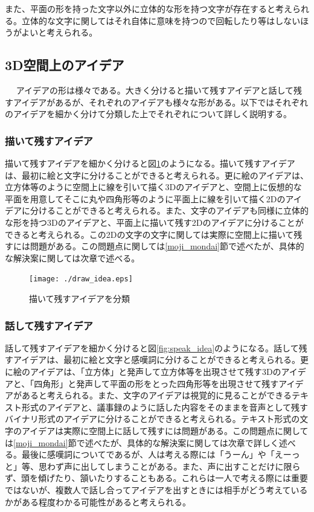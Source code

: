 \documentclass[11pt,a4j, titlepage]{jarticle} %
\begin{document}
また、平面の形を持った文字以外に立体的な形を持つ文字が存在すると考えられる。立体的な文字に関してはそれ自体に意味を持つので回転したり等はしないほうがよいと考えられる。

\subsection{3D空間上のアイデア}　\label{idea_katachi}
アイデアの形は様々である。大きく分けると描いて残すアイデアと話して残すアイデアがあるが、それぞれのアイデアも様々な形がある。以下ではそれぞれのアイデアを細かく分けて分類した上でそれぞれについて詳しく説明する。

\subsubsection{描いて残すアイデア} \label{draw_idea}
描いて残すアイデアを細かく分けると図\ref{fig:draw_idea}のようになる。描いて残すアイデアは、最初に絵と文字に分けることができると考えられる。更に絵のアイデアは、立方体等のように空間上に線を引いて描く3Dのアイデアと、空間上に仮想的な平面を用意してそこに丸や四角形等のように平面上に線を引いて描く2Dのアイデアに分けることができると考えられる。また、文字のアイデアも同様に立体的な形を持つ3Dのアイデアと、平面上に描いて残す2Dのアイデアに分けることができると考えられる。この2Dの文字の文字に関しては実際に空間上に描いて残すには問題がある。この問題点に関しては\ref{moji_mondai}節で述べたが、具体的な解決案に関しては次章で述べる。

\begin{figure}[H]
  \begin{center}
    \texttt{[image: ./draw\_idea.eps]}
    \caption{描いて残すアイデアを分類}
    \label{fig:draw_idea}
  \end{center}
\end{figure}

\subsubsection{話して残すアイデア} \label{speak_idea}
話して残すアイデアを細かく分けると図\ref{fig:speak_idea}のようになる。話して残すアイデアは、最初に絵と文字と感嘆詞に分けることができると考えられる。更に絵のアイデアは、「立方体」と発声して立方体等を出現させて残す3Dのアイデアと、「四角形」と発声して平面の形をとった四角形等を出現させて残すアイデアがあると考えられる。また、文字のアイデアは視覚的に見ることができるテキスト形式のアイデアと、議事録のように話した内容をそのままを音声として残すバイナリ形式のアイデアに分けることができると考えられる。テキスト形式の文字のアイデアは実際に空間上に話して残すには問題がある。この問題点に関しては\ref{moji_mondai}節で述べたが、具体的な解決案に関しては次章で詳しく述べる。最後に感嘆詞についてであるが、人は考える際には「うーん」や「えーっと」等、思わず声に出してしまうことがある。また、声に出すことだけに限らず、頭を傾げたり、頷いたりすることもある。これらは一人で考える際には重要ではないが、複数人で話し合ってアイデアを出すときには相手がどう考えているかがある程度わかる可能性があると考えられる。
\end{document}
